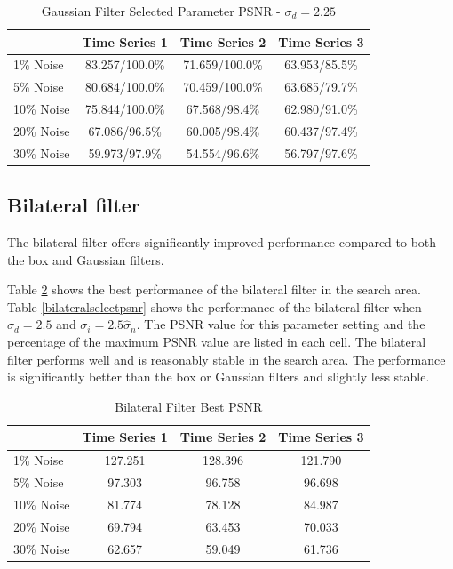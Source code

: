 \documentclass[11pt]{article}
\theoremstyle{definition}
\begin{document}
\begin{table}[!h]
\small
\begin{center}
\begin{tabular}{lccc}
\hline
 & Time Series 1 & Time Series 2 & Time Series 3 \\ \hline
1\% Noise & 83.257/100.0\% & 71.659/100.0\% & 63.953/85.5\% \\ \hline
5\% Noise & 80.684/100.0\% & 70.459/100.0\% & 63.685/79.7\% \\ \hline
10\% Noise & 75.844/100.0\% & 67.568/98.4\% & 62.980/91.0\% \\ \hline
20\% Noise & 67.086/96.5\% & 60.005/98.4\% & 60.437/97.4\% \\ \hline
30\% Noise & 59.973/97.9\% & 54.554/96.6\% & 56.797/97.6\% \\ \hline
\end{tabular}
\caption{Gaussian Filter Selected Parameter PSNR - $\sigma_d = 2.25$}
\label{gaussianselectpsnr}
\end{center}
\end{table}

\subsection{Bilateral filter} 
The bilateral filter offers significantly improved performance
compared to both the box and Gaussian filters.

Table \ref{bilateralbestpsnr} shows the best performance of the
bilateral filter in the search area. Table \ref{bilateralselectpsnr}
shows the performance of the bilateral filter when $\sigma_d = 2.5$
and $\sigma_i = 2.5 \hat{\sigma}_n$. The PSNR value for this parameter
setting and the percentage of the maximum PSNR value are listed in
each cell. The bilateral filter performs well and is reasonably stable
in the search area. The performance is significantly better than the
box or Gaussian filters and slightly less stable.

\begin{table}[!h]
\small
\begin{center}
\begin{tabular}{lccc}
\hline
 & Time Series 1 & Time Series 2 & Time Series 3 \\ \hline
1\% Noise & 127.251 & 128.396 & 121.790 \\ \hline
5\% Noise & 97.303 & 96.758 & 96.698 \\ \hline
10\% Noise & 81.774 & 78.128 & 84.987 \\ \hline
20\% Noise & 69.794 & 63.453 & 70.033 \\ \hline
30\% Noise & 62.657 & 59.049 & 61.736 \\ \hline
\end{tabular}
\caption{Bilateral Filter Best PSNR}
\label{bilateralbestpsnr}
\end{center}
\end{table}
\end{document}
